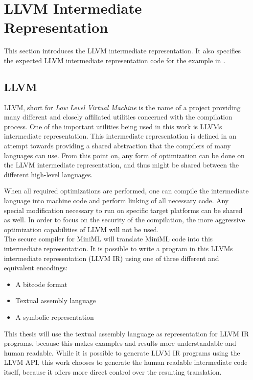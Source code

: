
\section{LLVM Intermediate Representation \label{sec:LLVM}}
This section introduces the LLVM intermediate representation.
It also specifies the expected LLVM intermediate representation code for the example in .

\subsection{LLVM}
LLVM, short for \emph{Low Level Virtual Machine} is the name of a project providing many different and closely affiliated utilities concerned with the compilation process.
One of the important utilities being used in this work is LLVMs intermediate representation.
This intermediate representation is defined in an attempt towards providing a shared abstraction that the compilers of many languages can use.
From this point on, any form of optimization can be done on the LLVM intermediate representation, and thus might be shared between the different high-level languages.

When all required optimizations are performed, one can compile the intermediate language into machine code and perform linking of all necessary code.
Any special modification necessary to run on specific target platforms can be shared as well.
In order to focus on the security of the compilation, the more aggressive optimization capabilities of LLVM will not be used.
\\[1em]
The secure compiler for \mbox{MiniML} will translate \mbox{MiniML} code into this intermediate representation.
It is possible to write a program in this LLVMs intermediate representation (LLVM IR) using one of three different and equivalent encodings:
\begin{itemize}
\item A bitcode format
\item Textual assembly language
\item A symbolic representation
\end{itemize}

This thesis will use the textual assembly language as representation for LLVM IR programs, because this makes examples and results more understandable and human readable.
While it is possible to generate LLVM IR programs using the LLVM API, this work chooses to generate the human readable intermediate code itself, because it offers more direct control over the resulting translation.

